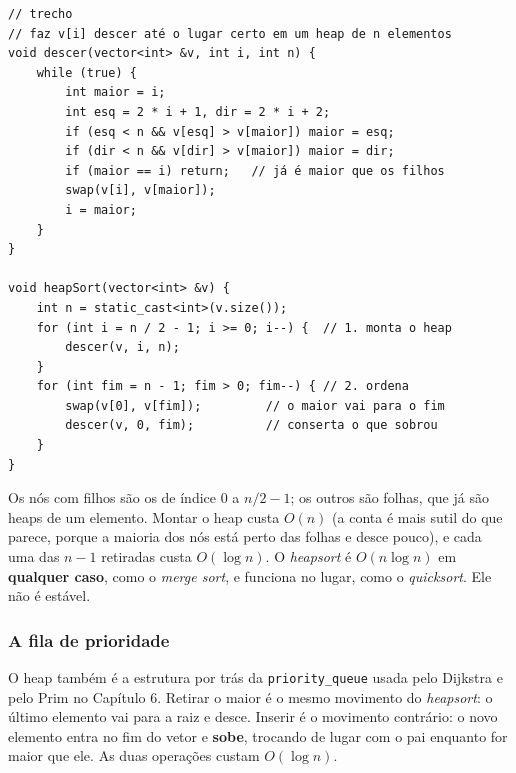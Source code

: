 \begin{codigo}
\begin{Verbatim}[breaklines=true, breaksymbolleft={}, fontsize=\footnotesize]
// trecho
// faz v[i] descer até o lugar certo em um heap de n elementos
void descer(vector<int> &v, int i, int n) {
    while (true) {
        int maior = i;
        int esq = 2 * i + 1, dir = 2 * i + 2;
        if (esq < n && v[esq] > v[maior]) maior = esq;
        if (dir < n && v[dir] > v[maior]) maior = dir;
        if (maior == i) return;   // já é maior que os filhos
        swap(v[i], v[maior]);
        i = maior;
    }
}

void heapSort(vector<int> &v) {
    int n = static_cast<int>(v.size());
    for (int i = n / 2 - 1; i >= 0; i--) {  // 1. monta o heap
        descer(v, i, n);
    }
    for (int fim = n - 1; fim > 0; fim--) { // 2. ordena
        swap(v[0], v[fim]);         // o maior vai para o fim
        descer(v, 0, fim);          // conserta o que sobrou
    }
}
\end{Verbatim}
\end{codigo}

Os nós com filhos são os de índice $0$ a $n/2 - 1$; os outros são folhas, que já são heaps de um elemento. Montar o heap custa $O(n)$ (a conta é mais sutil do que parece, porque a maioria dos nós está perto das folhas e desce pouco), e cada uma das $n - 1$ retiradas custa $O(\log n)$. O \textit{heapsort} é $O(n \log n)$ em \textbf{qualquer caso}, como o \textit{merge sort}, e funciona no lugar, como o \textit{quicksort}. Ele não é estável.

\subsubsection{A fila de prioridade}

O heap também é a estrutura por trás da \texttt{priority\_queue} usada pelo Dijkstra e pelo Prim no Capítulo 6. Retirar o maior é o mesmo movimento do \textit{heapsort}: o último elemento vai para a raiz e desce. Inserir é o movimento contrário: o novo elemento entra no fim do vetor e \textbf{sobe}, trocando de lugar com o pai enquanto for maior que ele. As duas operações custam $O(\log n)$.


